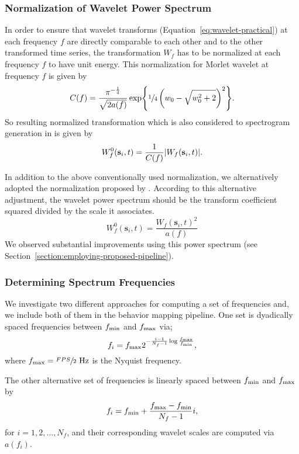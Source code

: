 \subsubsection{Normalization of Wavelet Power Spectrum}
In order to ensure that wavelet transforms (Equation~\ref{eq:wavelet-practical}) at each frequency $f$ are directly comparable to each other and to the other transformed time series, the transformation $W_f$ has to be normalized at each frequency $f$ to have unit energy.
This normalization for Morlet wavelet at frequency $f$ is given by
\begin{equation}
	C(f) = \frac{\pi^{-\frac{1}{4}}}{\sqrt{2a(f)}}\exp{\sfrac{1}{4}\left(w_0-\sqrt{w_0^2+2}\right)^2}.
\end{equation}
So resulting normalized transformation which is also considered to spectrogram generation in \citet{berman_mapping_2014} is given by
\begin{equation}
	W^0_f(\mathbf{s}_i, t) = \frac{1}{C(f)} \abs{W_f(\mathbf{s}_i, t)}.
\end{equation}

In addition to the above conventionally used normalization, we alternatively adopted the normalization proposed by \citet{liu_rectification_2007}. According to this alternative adjustment, the wavelet power spectrum should be the transform coefficient squared divided by the scale it associates.
\begin{equation}
	W^{0}_f(\mathbf{s}_i, t) = \frac{W_f(\mathbf{s}_i, t)^2}{a(f)}
\end{equation}
We observed substantial improvements using this power spectrum (see Section~\ref{section:employing-proposed-pipeline}).

\subsubsection{Determining Spectrum Frequencies}
We investigate two different approaches for computing a set of frequencies and, we include both of them in the behavior mapping pipeline.
One set is dyadically spaced frequencies between $f_{\textnormal{min}}$ and $f_{\textnormal{max}}$ via;
\begin{equation}
	f_i = f_{\textnormal{max}} 2^{-\frac{i-1}{N_f-1}\log{\frac{f_{\textnormal{max}}}{f_{\textnormal{min}}}}},
\end{equation}
where $f_{\textnormal{max}} = \sfrac{FPS}{2} \textnormal{ Hz}$ is the Nyquist frequency.

The other alternative set of frequencies is linearly spaced between $f_{\textnormal{min}}$ and $f_{\textnormal{max}}$ by
\begin{equation}
	f_i = f_{\textnormal{min}} + \frac{f_{\textnormal{max}} - f_{\textnormal{min}}}{N_f-1}i,
\end{equation}
for $i=1,2,\dots,N_f$, and their corresponding wavelet scales are computed via $a(f_i)$.

